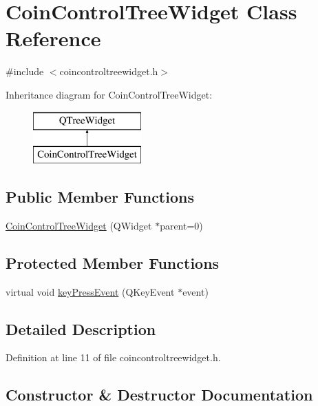 \hypertarget{class_coin_control_tree_widget}{}\section{Coin\+Control\+Tree\+Widget Class Reference}
\label{class_coin_control_tree_widget}


{\ttfamily \#include $<$coincontroltreewidget.\+h$>$}

Inheritance diagram for Coin\+Control\+Tree\+Widget\+:\begin{figure}[H]
\begin{center}
\leavevmode
\includegraphics[height=2.000000cm]{class_coin_control_tree_widget}
\end{center}
\end{figure}
\subsection*{Public Member Functions}
\begin{DoxyCompactItemize}
\item 
\hyperlink{class_coin_control_tree_widget_a426fcbff6c4a6707d50148b281b2dc3f}{Coin\+Control\+Tree\+Widget} (Q\+Widget $\ast$parent=0)
\end{DoxyCompactItemize}
\subsection*{Protected Member Functions}
\begin{DoxyCompactItemize}
\item 
virtual void \hyperlink{class_coin_control_tree_widget_a214c041952383bd6b8cb38fbccdd5c8c}{key\+Press\+Event} (Q\+Key\+Event $\ast$event)
\end{DoxyCompactItemize}


\subsection{Detailed Description}


Definition at line 11 of file coincontroltreewidget.\+h.



\subsection{Constructor \& Destructor Documentation}
\hypertarget{class_coin_control_tree_widget_a426fcbff6c4a6707d50148b281b2dc3f}{}
